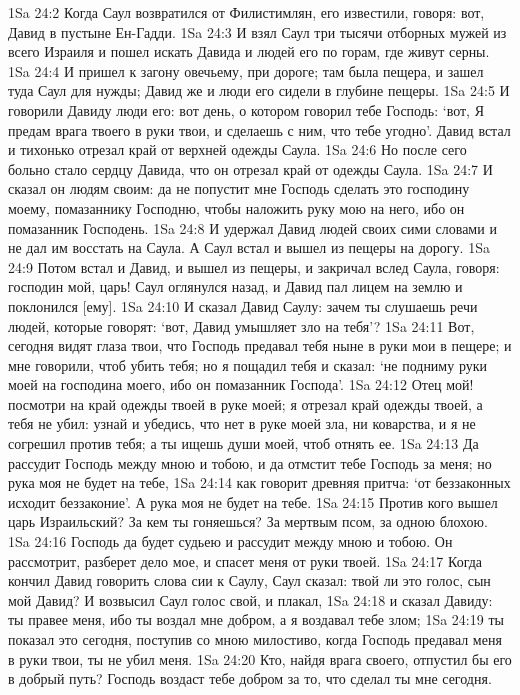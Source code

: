 1Sa 24:2  Когда Саул возвратился от Филистимлян, его известили, говоря: вот, Давид в пустыне Ен-Гадди.
1Sa 24:3  И взял Саул три тысячи отборных мужей из всего Израиля и пошел искать Давида и людей его по горам, где живут серны.
1Sa 24:4  И пришел к загону овечьему, при дороге; там была пещера, и зашел туда Саул для нужды; Давид же и люди его сидели в глубине пещеры.
1Sa 24:5  И говорили Давиду люди его: вот день, о котором говорил тебе Господь: `вот, Я предам врага твоего в руки твои, и сделаешь с ним, что тебе угодно'. Давид встал и тихонько отрезал край от верхней одежды Саула.
1Sa 24:6  Но после сего больно стало сердцу Давида, что он отрезал край от одежды Саула.
1Sa 24:7  И сказал он людям своим: да не попустит мне Господь сделать это господину моему, помазаннику Господню, чтобы наложить руку мою на него, ибо он помазанник Господень.
1Sa 24:8  И удержал Давид людей своих сими словами и не дал им восстать на Саула. А Саул встал и вышел из пещеры на дорогу.
1Sa 24:9  Потом встал и Давид, и вышел из пещеры, и закричал вслед Саула, говоря: господин мой, царь! Саул оглянулся назад, и Давид пал лицем на землю и поклонился [ему].
1Sa 24:10  И сказал Давид Саулу: зачем ты слушаешь речи людей, которые говорят: `вот, Давид умышляет зло на тебя'?
1Sa 24:11  Вот, сегодня видят глаза твои, что Господь предавал тебя ныне в руки мои в пещере; и мне говорили, чтоб убить тебя; но я пощадил тебя и сказал: `не подниму руки моей на господина моего, ибо он помазанник Господа'.
1Sa 24:12  Отец мой! посмотри на край одежды твоей в руке моей; я отрезал край одежды твоей, а тебя не убил: узнай и убедись, что нет в руке моей зла, ни коварства, и я не согрешил против тебя; а ты ищешь души моей, чтоб отнять ее.
1Sa 24:13  Да рассудит Господь между мною и тобою, и да отмстит тебе Господь за меня; но рука моя не будет на тебе,
1Sa 24:14  как говорит древняя притча: `от беззаконных исходит беззаконие'. А рука моя не будет на тебе.
1Sa 24:15  Против кого вышел царь Израильский? За кем ты гоняешься? За мертвым псом, за одною блохою.
1Sa 24:16  Господь да будет судьею и рассудит между мною и тобою. Он рассмотрит, разберет дело мое, и спасет меня от руки твоей.
1Sa 24:17  Когда кончил Давид говорить слова сии к Саулу, Саул сказал: твой ли это голос, сын мой Давид? И возвысил Саул голос свой, и плакал,
1Sa 24:18  и сказал Давиду: ты правее меня, ибо ты воздал мне добром, а я воздавал тебе злом;
1Sa 24:19  ты показал это сегодня, поступив со мною милостиво, когда Господь предавал меня в руки твои, ты не убил меня.
1Sa 24:20  Кто, найдя врага своего, отпустил бы его в добрый путь? Господь воздаст тебе добром за то, что сделал ты мне сегодня.
